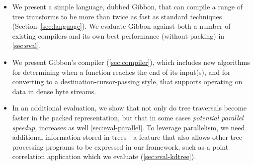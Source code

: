 \documentclass[a4paper,english]{lipics-v2016}
\newcommand{\treelang}{Gibbon\xspace} %
\begin{document}
\begin{itemize}
   
\item We present a simple language,
 dubbed \treelang, that can compile a range of tree transforms
 to be {more than twice as} fast as standard techniques (Section~\ref{sec:language}).
 We evaluate Gibbon against both a number of existing compilers and
 its own best performance (without packing) in \cref{sec:eval}.

\item We present Gibbon's compiler (\cref{sec:compiler}), which includes new
  algorithms for determining when a function reaches the end of its input(s), and
  for converting to a destination-cursor-passing style, that supports
  operating on data in dense byte streams.

  
\item In an additional evaluation, we show that not only do tree traversals
  become faster in the packed representation, {but that in some cases {\em
      potential parallel speedup}, increases as well} \cref{sec:eval-parallel}.
  To leverage parallelism, we need additional information stored in trees---a
  feature that also allows other tree-processing programs to be expressed in our
  framework, such as a point correlation application which we evaluate (\cref{sec:eval-kdtree}).
  
\end{itemize}


\end{document}

